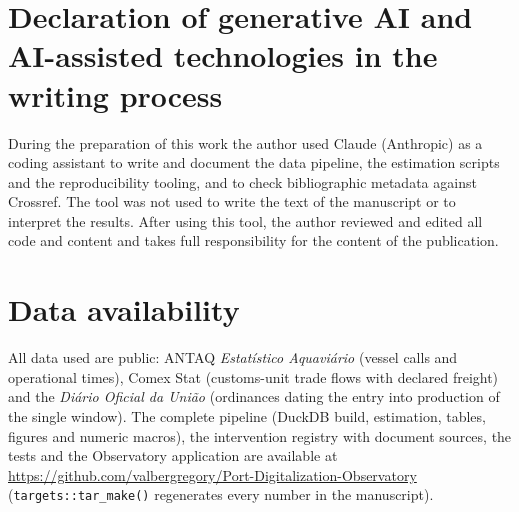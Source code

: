 \documentclass[12pt,a4paper]{article}
\begin{document}
\section*{Declaration of generative AI and AI-assisted technologies in the writing process}
During the preparation of this work the author used Claude (Anthropic) as a
coding assistant to write and document the data pipeline, the estimation
scripts and the reproducibility tooling, and to check bibliographic metadata
against Crossref. The tool was not used to write the text of the manuscript
or to interpret the results. After using this tool, the author reviewed and
edited all code and content and takes full responsibility for the content of
the publication.

\section*{Data availability}
All data used are public: ANTAQ \emph{Estat\'istico Aquavi\'ario} (vessel
calls and operational times), Comex Stat (customs-unit trade flows with
declared freight) and the \emph{Di\'ario Oficial da Uni\~ao} (ordinances dating
the entry into production of the single window). The complete pipeline
(DuckDB build, estimation, tables, figures and numeric macros), the
intervention registry with document sources, the tests and the Observatory
application are available at
\url{https://github.com/valbergregory/Port-Digitalization-Observatory}
(\texttt{targets::tar\_make()} regenerates every number in the manuscript).
\end{document}
